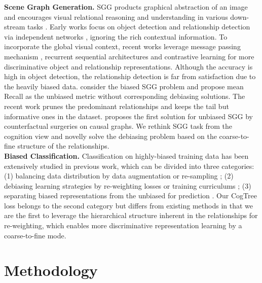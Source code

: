 \documentclass{article}
\begin{document}
\textbf{Scene Graph Generation.}
SGG \cite{xu2017scene} products graphical abstraction of an image and encourages visual relational reasoning and understanding in various down-stream tasks \cite{shi2019explainable,Zhu2020Mucko}. Early works focus on object detection and relationship detection via independent networks \cite{lu2016visual,Zhang2017Relationship}, ignoring the rich contextual information. To incorporate the global visual context, recent works leverage message passing mechanism \cite{xu2017scene,chen2019counterfactual},  recurrent sequential architectures \cite{zellers2018neural,tang2019learning} and contrastive learning \cite{Zhang2019Graphical} 
for more discriminative object and relationship representations. Although the accuracy is high in object detection, the relationship detection is far from satisfaction due to the heavily biased data. \cite{chen2019knowledge,tang2019learning} consider the biased SGG problem and propose mean Recall as the unbiased metric without corresponding debiasing solutions. The recent work \cite{Liang2019VRR} prunes the predominant relationships and keeps the tail but informative ones in the dataset. \cite{Tang2020Unbiased} proposes the first solution for unbiased SGG  by counterfactual surgeries on causal graphs. We rethink SGG task from the cognition 
view and novelly  solve the debiasing problem based on the coarse-to-fine structure of the relationships. \\
\textbf{Biased Classification.}
Classification on highly-biased training data has been extensively studied in previous work, which can be divided into three categories: (1) balancing data distribution by data augmentation or re-sampling \cite{burnaev2015influence,li2019repair}; 
(2) debiasing learning strategies by re-weighting losses or training curriculums \cite{lin2017focal,Cui2019Class}; 
(3) separating biased representations from the unbiased for prediction \cite{cadene2019rubi,Tang2020Unbiased}. 
Our CogTree loss belongs to the second category but differs from existing methods in that we are the first to leverage the hierarchical structure inherent in the relationships for re-weighting, which enables more discriminative representation learning by a coarse-to-fine mode. 














\section{Methodology}
\label{sec:method}
\end{document}
